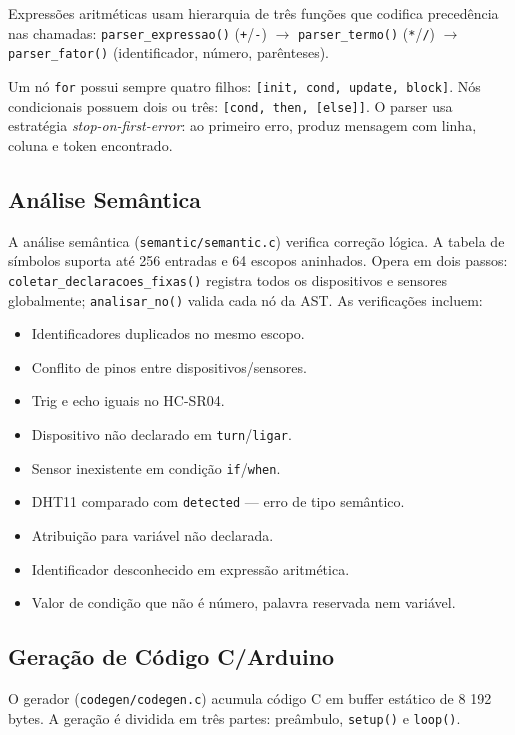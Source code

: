 \documentclass[conference]{IEEEtran}
\begin{document}
Expressões aritméticas usam hierarquia de três funções que codifica
precedência nas chamadas: \texttt{parser\_expressao()} (\texttt{+}/\texttt{-})
$\to$ \texttt{parser\_termo()} (\texttt{*}/\texttt{/}) $\to$
\texttt{parser\_fator()} (identificador, número, parênteses).

Um nó \texttt{for} possui sempre quatro filhos: \texttt{[init, cond, update, block]}. Nós condicionais possuem dois ou três: \texttt{[cond, then, [else]]}. O parser usa estratégia \textit{stop-on-first-error}: ao primeiro erro, produz mensagem com linha, coluna e token encontrado.

\subsection{Análise Semântica}

A análise semântica (\texttt{semantic/semantic.c}) verifica correção lógica.
A tabela de símbolos suporta até 256 entradas e 64 escopos aninhados.
Opera em dois passos: \texttt{coletar\_declaracoes\_fixas()} registra todos
os dispositivos e sensores globalmente; \texttt{analisar\_no()} valida cada
nó da AST. As verificações incluem:

\begin{itemize}
\item Identificadores duplicados no mesmo escopo.
\item Conflito de pinos entre dispositivos/sensores.
\item Trig e echo iguais no HC-SR04.
\item Dispositivo não declarado em \texttt{turn}/\texttt{ligar}.
\item Sensor inexistente em condição \texttt{if}/\texttt{when}.
\item DHT11 comparado com \texttt{detected} — erro de tipo semântico.
\item Atribuição para variável não declarada.
\item Identificador desconhecido em expressão aritmética.
\item Valor de condição que não é número, palavra reservada nem variável.
\end{itemize}

\subsection{Geração de Código C/Arduino}

O gerador (\texttt{codegen/codegen.c}) acumula código C em buffer estático
de 8 192 bytes. A geração é dividida em três partes: preâmbulo,
\texttt{setup()} e \texttt{loop()}.
\end{document}
